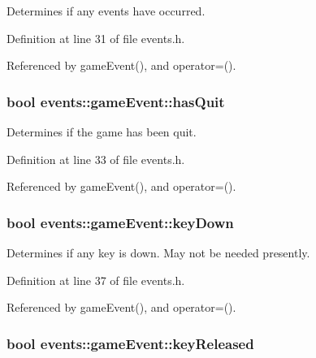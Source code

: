 Determines if any events have occurred. 



Definition at line 31 of file events.\+h.



Referenced by game\+Event(), and operator=().

\hypertarget{structevents_1_1game_event_a201a773c16c73b1c8e5101274cc4de97}{}
\subsubsection[{has\+Quit}]{\setlength{\rightskip}{0pt plus 5cm}bool events\+::game\+Event\+::has\+Quit}\label{structevents_1_1game_event_a201a773c16c73b1c8e5101274cc4de97}


Determines if the game has been quit. 



Definition at line 33 of file events.\+h.



Referenced by game\+Event(), and operator=().

\hypertarget{structevents_1_1game_event_a81ecfd12bec9ce82b20462df4442c6c0}{}
\subsubsection[{key\+Down}]{\setlength{\rightskip}{0pt plus 5cm}bool events\+::game\+Event\+::key\+Down}\label{structevents_1_1game_event_a81ecfd12bec9ce82b20462df4442c6c0}


Determines if any key is down. May not be needed presently. 



Definition at line 37 of file events.\+h.



Referenced by game\+Event(), and operator=().

\hypertarget{structevents_1_1game_event_adaac56b596a9462763fc6504c0059fb9}{}
\subsubsection[{key\+Released}]{\setlength{\rightskip}{0pt plus 5cm}bool events\+::game\+Event\+::key\+Released}\label{structevents_1_1game_event_adaac56b596a9462763fc6504c0059fb9}


